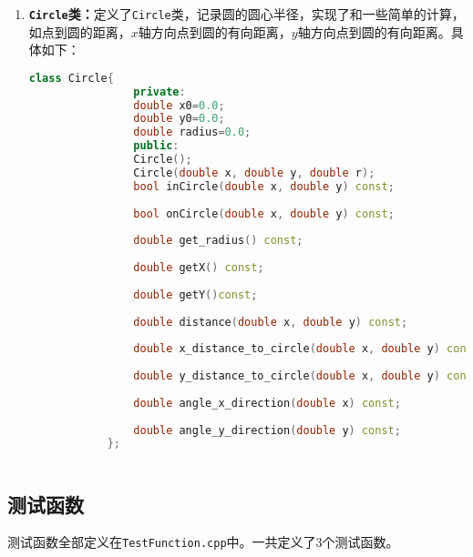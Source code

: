 \documentclass[UTF8]{ctexart}
\begin{document}
\begin{enumerate}
		\begin{lstlisting}[language=C++, caption={运算符实现},
			 label={lst:operators}]
		public:
			EquationSolver(const int &_N, const Function &f) //对于规则区域求解，需要输入格点数目和方程右端函数
			EquationSolver(const int &_N, const Function &f, Circle *_c):N(_N), c(_c) //对于不规则区域求解，需要输入格点数目和方程右端函数以及圆的参数
			void norm_error(const Function &f,const string &filename)//计算$l_1$ $l_2$ $l_\infty$范数下的误差，将误差输出到屏幕和文件
			void solveEquation(const Function &g, const double &initial=0.0, const vector<int> &mixed=vector<int>{0,0,0,0,0}) //求解方程
			void print(const string &filename, const Function &f) //将格点 格点上的真实值 格点上的数值解输出到文件。
		\end{lstlisting}
		\item \textbf{\texttt{Circle}类：}定义了\texttt{Circle}类，记录圆的圆心半径，实现了和一些简单的计算，如点到圆的距离，$x$轴方向点到圆的有向距离，$y$轴方向点到圆的有向距离。具体如下：
		\begin{lstlisting}[language=C++, caption={运算符实现},
			label={lst:operators}]
			class Circle{
				private:
				double x0=0.0;
				double y0=0.0;
				double radius=0.0;
				public:
				Circle();
				Circle(double x, double y, double r);
				bool inCircle(double x, double y) const;
				
				bool onCircle(double x, double y) const;
				
				double get_radius() const;
				
				double getX() const;
				
				double getY()const;
				
				double distance(double x, double y) const;
				
				double x_distance_to_circle(double x, double y) const;  //有向距离
				
				double y_distance_to_circle(double x, double y) const; //有向距离
				
				double angle_x_direction(double x) const; 
				
				double angle_y_direction(double y) const;
			};
			
		\end{lstlisting}
	\end{enumerate}
	\subsection{测试函数}
	测试函数全部定义在\texttt{TestFunction.cpp}中。一共定义了3个测试函数。
\end{document}
